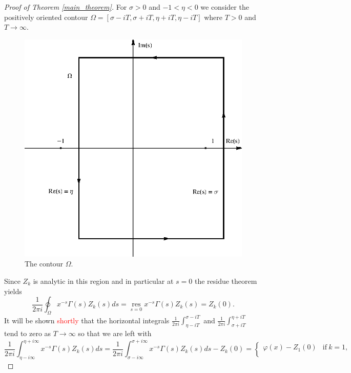 \documentclass[11pt]{article}
\numberwithin{equation}{section}		 			%
\numberwithin{figure}{section}			 			%
\begin{document}
\begin{proof}[Proof of Theorem \eqref{main_theorem}]
For $\sigma > 0$ and $-1 < \eta < 0$ we consider the positively oriented contour $\Omega = [\sigma - iT, \sigma + iT, \eta +iT, \eta-iT]$ where $T>0$ and $T \to \infty$. 
\begin{figure}[H]
	\centering
		\includegraphics{ContoursPlots_gr3.eps}
	\caption{The contour $\Omega$.}
\end{figure}
\noindent Since $Z_k$ is analytic in this region and in particular at $s=0$ the residue theorem yields
\[
\frac{1}{{2\pi i}}\oint_\Omega  {x^{ - s} \Gamma (s)Z_k (s)ds}  = \mathop {\operatorname{res} }\limits_{s = 0} x^{ - s} \Gamma (s)Z_k (s) = Z_k (0).
\]
It will be shown \textcolor{red}{shortly} that the horizontal integrals $\tfrac{1}{{2\pi i}}\int_{\eta  - iT}^{\sigma  - iT}$ and $\tfrac{1}{{2\pi i}}\int_{\sigma  + iT}^{\eta  + iT}$ tend to zero as $T \to \infty$ so that we are left with
\begin{equation} \label{phi_psi_k_cases_eta}
\frac{1}
{{2\pi i}}\int_{\eta  - i\infty }^{\eta  + i\infty } {x^{ - s} \Gamma (s)Z_k (s)ds}  = \frac{1}
{{2\pi i}}\int_{\sigma  - i\infty }^{\sigma  + i\infty } {x^{ - s} \Gamma (s)Z_k (s)ds}  - Z_k(0) =
			\begin{cases}
{\varphi (x) - Z_1 (0)} & \mathrm{if\ } k=1, \\ 

\end{cases}
\end{equation}
\end{proof}
\end{document}
